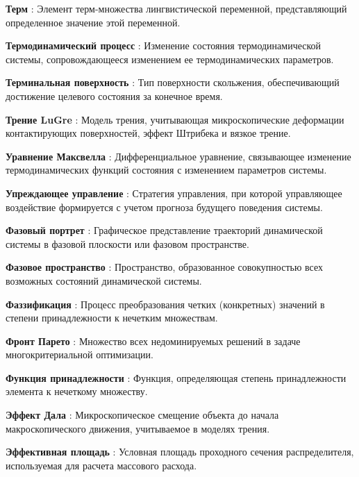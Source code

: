 \textbf{Терм} : Элемент терм-множества лингвистической переменной, представляющий определенное значение этой переменной.

\textbf{Термодинамический процесс} : Изменение состояния термодинамической системы, сопровождающееся изменением ее термодинамических параметров.

\textbf{Терминальная поверхность} : Тип поверхности скольжения, обеспечивающий достижение целевого состояния за конечное время.

\textbf{Трение LuGre} : Модель трения, учитывающая микроскопические деформации контактирующих поверхностей, эффект Штрибека и вязкое трение.

\textbf{Уравнение Максвелла} : Дифференциальное уравнение, связывающее изменение термодинамических функций состояния с изменением параметров системы.

\textbf{Упреждающее управление} : Стратегия управления, при которой управляющее воздействие формируется с учетом прогноза будущего поведения системы.

\textbf{Фазовый портрет} : Графическое представление траекторий динамической системы в фазовой плоскости или фазовом пространстве.

\textbf{Фазовое пространство} : Пространство, образованное совокупностью всех возможных состояний динамической системы.

\textbf{Фаззификация} : Процесс преобразования четких (конкретных) значений в степени принадлежности к нечетким множествам.

\textbf{Фронт Парето} : Множество всех недоминируемых решений в задаче многокритериальной оптимизации.

\textbf{Функция принадлежности} : Функция, определяющая степень принадлежности элемента к нечеткому множеству.

\textbf{Эффект Дала} : Микроскопическое смещение объекта до начала макроскопического движения, учитываемое в моделях трения.

\textbf{Эффективная площадь} : Условная площадь проходного сечения распределителя, используемая для расчета массового расхода.

